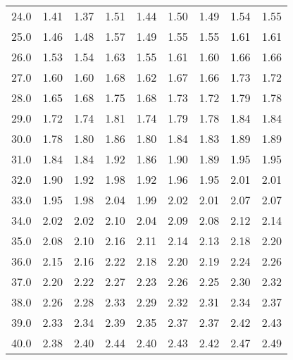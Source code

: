 \begin{tabular}{|r|llllllll|}
    24.0                            & 1.41      & 1.37  & 1.51  & 1.44  & 1.50  & 1.49  & 1.54  & 1.55  \\
    25.0                            & 1.46      & 1.48  & 1.57  & 1.49  & 1.55  & 1.55  & 1.61  & 1.61  \\
    26.0                            & 1.53      & 1.54  & 1.63  & 1.55  & 1.61  & 1.60  & 1.66  & 1.66  \\
    27.0                            & 1.60      & 1.60  & 1.68  & 1.62  & 1.67  & 1.66  & 1.73  & 1.72  \\
    28.0                            & 1.65      & 1.68  & 1.75  & 1.68  & 1.73  & 1.72  & 1.79  & 1.78  \\
    29.0                            & 1.72      & 1.74  & 1.81  & 1.74  & 1.79  & 1.78  & 1.84  & 1.84  \\
    30.0                            & 1.78      & 1.80  & 1.86  & 1.80  & 1.84  & 1.83  & 1.89  & 1.89  \\
    31.0                            & 1.84      & 1.84  & 1.92  & 1.86  & 1.90  & 1.89  & 1.95  & 1.95  \\
    32.0                            & 1.90      & 1.92  & 1.98  & 1.92  & 1.96  & 1.95  & 2.01  & 2.01  \\
    33.0                            & 1.95      & 1.98  & 2.04  & 1.99  & 2.02  & 2.01  & 2.07  & 2.07  \\
    34.0                            & 2.02      & 2.02  & 2.10  & 2.04  & 2.09  & 2.08  & 2.12  & 2.14  \\
    35.0                            & 2.08      & 2.10  & 2.16  & 2.11  & 2.14  & 2.13  & 2.18  & 2.20  \\
    36.0                            & 2.15      & 2.16  & 2.22  & 2.18  & 2.20  & 2.19  & 2.24  & 2.26  \\
    37.0                            & 2.20      & 2.22  & 2.27  & 2.23  & 2.26  & 2.25  & 2.30  & 2.32  \\
    38.0                            & 2.26      & 2.28  & 2.33  & 2.29  & 2.32  & 2.31  & 2.34  & 2.37  \\
    39.0                            & 2.33      & 2.34  & 2.39  & 2.35  & 2.37  & 2.37  & 2.42  & 2.43  \\
    40.0                            & 2.38      & 2.40  & 2.44  & 2.40  & 2.43  & 2.42  & 2.47  & 2.49  \\ 
\hline
\end{tabular}